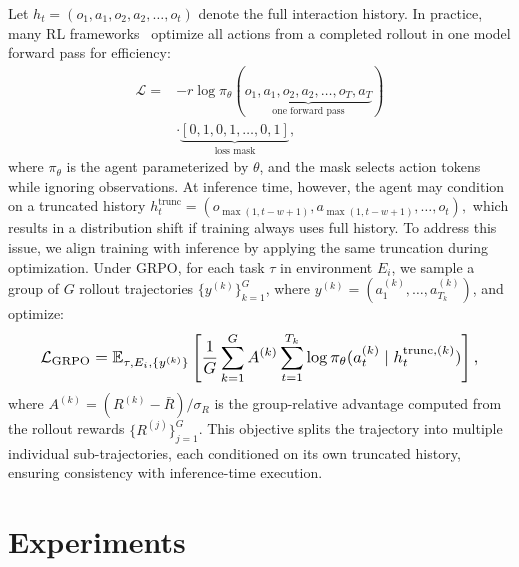 \documentclass{article}
\theoremstyle{plain}
\theoremstyle{definition}
\theoremstyle{remark}
\begin{document}
Let $h_t = (o_1, a_1, o_2, a_2, \ldots, o_t)$ denote the full interaction history. In practice, many RL frameworks~\citep{verl,openrlhf} optimize all actions from a completed rollout in one model forward pass for efficiency:
\begin{equation}
\begin{split}
\mathcal{L} = &-r \log \pi_\theta(\underbrace{o_1, a_1, o_2, a_2, \ldots, o_T, a_T}_{\text{one forward pass}}) \\
&\cdot \underbrace{[0, 1, 0, 1, \ldots, 0, 1]}_{\text{loss mask}},
\end{split}
\end{equation}
where $\pi_\theta$ is the agent parameterized by $\theta$, and the mask selects action tokens while ignoring observations.
At inference time, however, the agent may condition on a truncated history
$
h_t^{\text{trunc}} = (o_{\max(1, t-w+1)}, a_{\max(1, t-w+1)}, \ldots, o_t),
$
which results in a distribution shift if training always uses full history. To address this issue, we align training with inference by applying the same truncation during optimization. Under GRPO, for each task $\tau$ in environment $E_i$, we sample a group of $G$ rollout trajectories $\{y^{(k)}\}_{k=1}^G$, where $y^{(k)} = (a_1^{(k)}, \ldots, a_{T_k}^{(k)})$, and optimize:
\begin{equation}
\resizebox{0.91\columnwidth}{!}{$\displaystyle
\mathcal{L}_{\text{GRPO}} = \mathbb{E}_{\tau, E_i, \{y^{(k)}\}} \left[
\frac{1}{G} \sum_{k=1}^{G} A^{(k)} \sum_{t=1}^{T_k}
\log \pi_\theta(a_t^{(k)} \mid h_t^{\text{trunc},(k)})
\right],
$}
\end{equation}
where $A^{(k)} = (R^{(k)} - \bar{R}) / \sigma_R$ is the group-relative advantage computed from the rollout rewards $\{R^{(j)}\}_{j=1}^G$. This objective splits the trajectory into multiple individual sub-trajectories, each conditioned on its own truncated history, ensuring consistency with inference-time execution. 


\section{Experiments}
\end{document}

